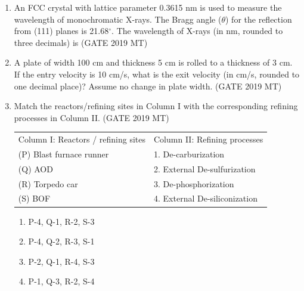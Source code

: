 \documentclass[12pt]{article}
\begin{document}
\begin{enumerate}
\item An FCC crystal with lattice parameter 0.3615 nm is used to measure the wavelength of monochromatic X-rays. The Bragg angle ($\theta$) for the reflection from (111) planes is 21.68$^\circ$. The wavelength of X-rays (in nm, rounded to three decimals) is \hspace{1em} (GATE 2019 MT)


\item A plate of width 100 cm and thickness 5 cm is rolled to a thickness of 3 cm. If the entry velocity is 10 cm/s, what is the exit velocity (in cm/s, rounded to one decimal place)? Assume no change in plate width. (GATE 2019 MT)

















\item Match the reactors/refining sites in Column I with the corresponding refining processes in Column II. (GATE 2019 MT)
\begin{center}
\begin{tabular}{ll} 
Column I: Reactors / refining sites & Column II: Refining processes \\
(P) Blast furnace runner           & 1. De-carburization         \\
(Q) AOD                            & 2. External De-sulfurization   \\
(R) Torpedo car                    & 3. De-phosphorization      \\
(S) BOF                            & 4. External De-siliconization \\
\end{tabular}
\end{center}
\begin{enumerate}[label=(\alph*)]
    \item P-4, Q-1, R-2, S-3
    \item P-4, Q-2, R-3, S-1
    \item P-2, Q-1, R-4, S-3
    \item P-1, Q-3, R-2, S-4
\end{enumerate}


\end{enumerate}
\end{document}
